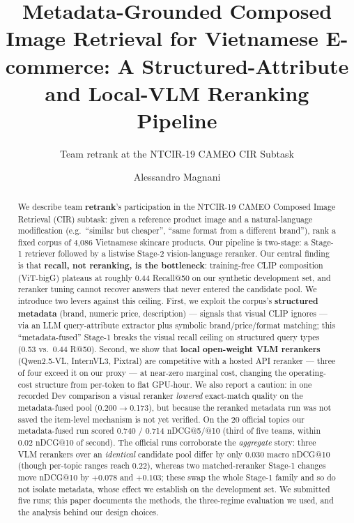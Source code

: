 \documentclass[sigconf,nonacm]{acmart}
\begin{document}
\title{Metadata-Grounded Composed Image Retrieval for Vietnamese
E-commerce: A Structured-Attribute and Local-VLM Reranking Pipeline}
\subtitle{Team retrank at the NTCIR-19 CAMEO CIR Subtask}

\author{Alessandro Magnani}

\begin{abstract}
We describe team \textbf{retrank}'s participation in the NTCIR-19 CAMEO
Composed Image Retrieval (CIR) subtask: given a reference product image and
a natural-language modification (e.g.\ ``similar but cheaper'', ``same
format from a different brand''), rank a fixed corpus of 4{,}086 Vietnamese
skincare products. Our pipeline is two-stage: a Stage-1 retriever
followed by a listwise Stage-2 vision-language reranker. Our central finding
is that \textbf{recall, not reranking, is the bottleneck}: training-free
CLIP composition (ViT-bigG) plateaus at roughly 0.44 Recall@50 on our
synthetic development set, and reranker tuning cannot recover answers that
never entered the candidate pool. We introduce two levers against this
ceiling. First, we exploit the corpus's \textbf{structured metadata}
(brand, numeric price, description) --- signals that visual CLIP ignores ---
via an LLM query-attribute extractor plus symbolic brand/price/format
matching; this ``metadata-fused'' Stage-1 breaks the visual recall ceiling
on structured query types (0.53 vs.\ 0.44 R@50). Second, we show that \textbf{local open-weight VLM rerankers}
(Qwen2.5-VL, InternVL3, Pixtral) are competitive with a hosted API reranker
--- three of four exceed it on our proxy --- at near-zero marginal cost,
changing the operating-cost structure from per-token to flat GPU-hour. We
also report a caution: in one recorded Dev comparison a visual reranker
\emph{lowered} exact-match quality on the metadata-fused pool
(0.200$\to$0.173), but because the reranked metadata run was not saved the
item-level mechanism is not yet verified. On the 20 official topics our
metadata-fused run scored 0.740 / 0.714 nDCG@5/@10 (third of five teams, within
0.02 nDCG@10 of second). The official runs corroborate the \emph{aggregate}
story: three VLM rerankers over an \emph{identical} candidate pool differ by
only 0.030 macro nDCG@10 (though per-topic ranges reach 0.22), whereas two
matched-reranker Stage-1 changes move nDCG@10 by $+0.078$ and $+0.103$; these
swap the whole Stage-1 family and so do not isolate metadata, whose effect we
establish on the development set. We submitted five runs; this paper
documents the methods, the three-regime evaluation we used, and the analysis
behind our design choices.
\end{abstract}
\end{document}
